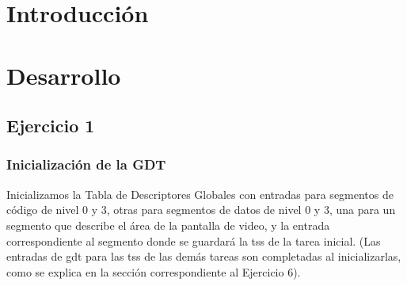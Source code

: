 \documentclass[a4paper]{article}
\begin{document}
\thispagestyle{empty}

\maketitle
\newpage

\thispagestyle{empty}
\vfill

\thispagestyle{empty}
\vspace{3cm}
\tableofcontents
\newpage

\newpage

\section{Introducción}

\newpage

\section{Desarrollo} 

\subsection{Ejercicio 1}

\subsubsection*{Inicialización de la GDT}

Inicializamos la Tabla de Descriptores Globales con entradas para segmentos de código de nivel 0 y 3, otras para segmentos de datos de nivel 0 y 3, una para un segmento que describe el área de la pantalla de video, y la entrada correspondiente al segmento donde se guardará la tss de la tarea inicial. (Las entradas de gdt para las tss de las demás tareas son completadas al inicializarlas, como se explica en la sección correspondiente al Ejercicio 6).
\end{document}
